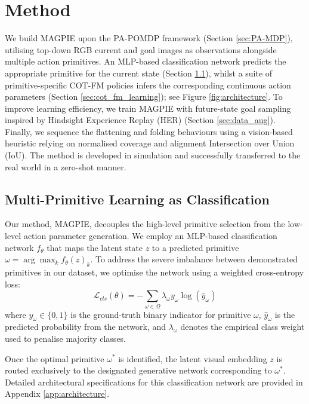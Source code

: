 \documentclass[journal]{IEEEtran}
\begin{document}
\section{Method} \label{sec:method}

We build MAGPIE upon the PA-POMDP framework (Section \ref{sec:PA-MDP}), utilising top-down RGB current and goal images as observations alongside multiple action primitives. An MLP-based classification network predicts the appropriate primitive for the current state (Section \ref{sec:classification}), whilst a suite of primitive-specific COT-FM policies infers the corresponding continuous action parameters (Section \ref{sec:cot_fm_learning}); see Figure \ref{fig:architecture}. To improve learning efficiency, we train MAGPIE with future-state goal sampling inspired by Hindsight Experience Replay (HER) \cite{andrychowicz2017hindsight} (Section \ref{sec:data_aug}). Finally, we sequence the flattening and folding behaviours using a vision-based heuristic relying on normalised coverage and alignment Intersection over Union (IoU). The method is developed in simulation and successfully transferred to the real world in a zero-shot manner.

\subsection{Multi-Primitive Learning as Classification}
\label{sec:classification}

Our method, MAGPIE, decouples the high-level primitive selection from the low-level action parameter generation. We employ an MLP-based classification network $f_\theta$ that maps the latent state $z$ to a predicted primitive $\omega = \arg\max_k f_{\theta}(z)_k$. To address the severe imbalance between demonstrated primitives in our dataset, we optimise the network using a weighted cross-entropy loss:
$$\mathcal{L}_{cls}(\theta) = - \sum_{\omega \in \Omega} \lambda_\omega y_\omega \log(\hat{y}_\omega)$$
where $y_\omega \in \{0, 1\}$ is the ground-truth binary indicator for primitive $\omega$, $\hat{y}_\omega$ is the predicted probability from the network, and $\lambda_\omega$ denotes the empirical class weight used to penalise majority classes. 

Once the optimal primitive $\omega^*$ is identified, the latent visual embedding $z$ is routed exclusively to the designated generative network corresponding to $\omega^*$. Detailed architectural specifications for this classification network are provided in Appendix \ref{app:architecture}.
\end{document}
